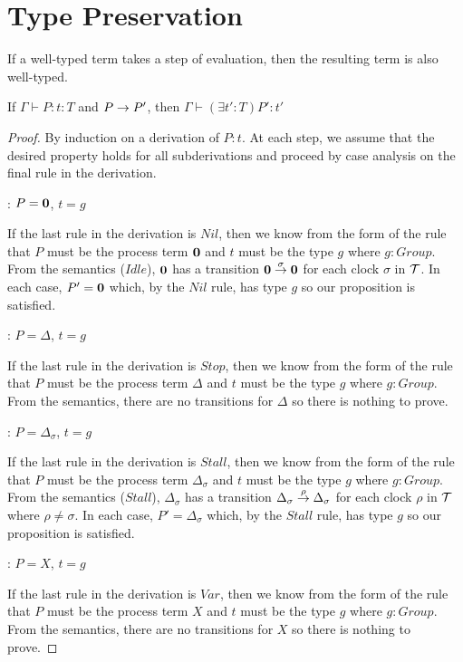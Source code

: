 \chapter{Type Preservation}

If a well-typed term takes a step of evaluation, then the resulting
term is also well-typed.

\begin{proposition}
If $\Gamma \vdash P : t : T$ and $P \stackrel{}{\rightarrow} P'$, then $\Gamma \vdash (\exists t' : T) P' : t'$
\end{proposition}

\begin{proof}
By induction on a derivation of $P:t$.  At each step, we assume that
the desired property holds for all subderivations and proceed by case
analysis on the final rule in the derivation.

: $P = \textbf{0}$, $t = g$

\noindent If the last rule in the derivation is $Nil$, then we know
from the form of the rule that $P$ must be the process term $\textbf{0}$ and
$t$ must be the type $g$ where $g : Group$.  From the semantics
($Idle$), $\textbf{0}$ has a transition $\textbf{0} \stackrel{\sigma}{\rightarrow} \textbf{0}$ for
each clock $\sigma$ in $\text{$\mathcal{T}$}$.  In each case, $P' = \textbf{0}$ which, by
the $Nil$ rule, has type $g$ so our proposition is satisfied.

: $P = \Delta$, $t = g$

\noindent If the last rule in the derivation is $Stop$, then we know
from the form of the rule that $P$ must be the process term $\Delta$
and $t$ must be the type $g$ where $g : Group$.  From the semantics,
there are no transitions for $\Delta$ so there is nothing to prove.

: $P = \Delta_\sigma$, $t = g$

\noindent If the last rule in the derivation is $Stall$, then we know
from the form of the rule that $P$ must be the process term
$\Delta_\sigma$ and $t$ must be the type $g$ where $g : Group$.  From
the semantics ($Stall$), $\Delta_\sigma$ has a transition
$\Delta_\sigma \stackrel{\rho}{\rightarrow} \Delta_\sigma$ for each clock $\rho$ in
$\text{$\mathcal{T}$}$ where $\rho \ne \sigma$.  In each case, $P' = \Delta_\sigma$
which, by the $Stall$ rule, has type $g$ so our proposition is
satisfied.

: $P = X$, $t = g$

\noindent If the last rule in the derivation is $Var$, then we know
from the form of the rule that $P$ must be the process term $X$ and
$t$ must be the type $g$ where $g : Group$.  From the semantics, there
are no transitions for $X$ so there is nothing to prove.


\end{proof}

